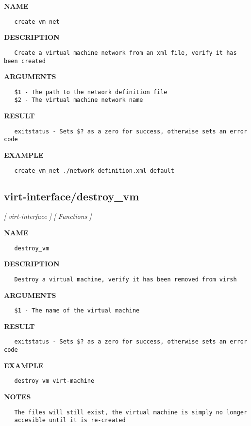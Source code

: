 \label{ch:robo59}
\label{ch:virt_interface_create_vm_net}
\textbf{NAME}
\begin{verbatim}
   create_vm_net
\end{verbatim}
\textbf{DESCRIPTION}
\begin{verbatim}
   Create a virtual machine network from an xml file, verify it has been created 
\end{verbatim}
\textbf{ARGUMENTS}
\begin{verbatim}
   $1 - The path to the network definition file
   $2 - The virtual machine network name
\end{verbatim}
\textbf{RESULT}
\begin{verbatim}
   exitstatus - Sets $? as a zero for success, otherwise sets an error code
\end{verbatim}
\textbf{EXAMPLE}
\begin{verbatim}
   create_vm_net ./network-definition.xml default
\end{verbatim}
\newpage
\subsection{virt-interface/destroy\_vm}
\textsl{[ virt-interface ]}
\textsl{[ Functions ]}

\label{ch:robo60}
\label{ch:virt_interface_destroy_vm}
\textbf{NAME}
\begin{verbatim}
   destroy_vm
\end{verbatim}
\textbf{DESCRIPTION}
\begin{verbatim}
   Destroy a virtual machine, verify it has been removed from virsh
\end{verbatim}
\textbf{ARGUMENTS}
\begin{verbatim}
   $1 - The name of the virtual machine
\end{verbatim}
\textbf{RESULT}
\begin{verbatim}
   exitstatus - Sets $? as a zero for success, otherwise sets an error code
\end{verbatim}
\textbf{EXAMPLE}
\begin{verbatim}
   destroy_vm virt-machine
\end{verbatim}
\textbf{NOTES}
\begin{verbatim}
   The files will still exist, the virtual machine is simply no longer 
   accesible until it is re-created 
\end{verbatim}
\newpage
